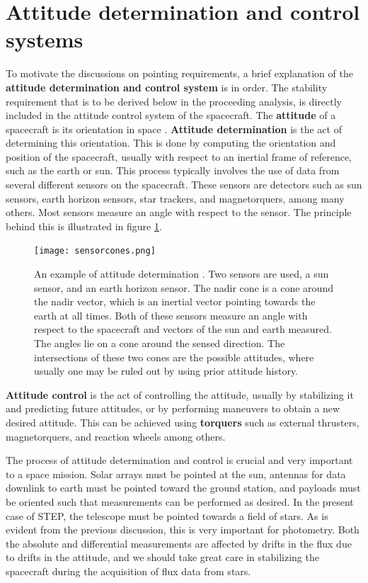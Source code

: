 \documentclass[../main.tex]{subfiles}
\begin{document}
\section{Attitude determination and control systems}
To motivate the discussions on pointing requirements, a brief explanation of the \textbf{attitude determination and control system} is in order. The stability requirement that is to be derived below in the proceeding analysis, is directly included in the attitude control system of the spacecraft. 
The \textbf{attitude} of a spacecraft is its orientation in space \cite{adcsbook}. 
\textbf{Attitude determination} is the act of determining this orientation. This is done by computing the orientation and position of the spacecraft, usually with respect to an inertial frame of reference, such as the earth or sun. This process typically involves the use of data from several different sensors on the spacecraft. These sensors are detectors such as sun sensors, earth horizon sensors, star trackers, and magnetorquers, among many others. Most sensors measure an angle with respect to the sensor. The principle behind this is illustrated in figure \ref{fig:sensorcones}. 

\begin{figure}[h!]
	\centering
	\texttt{[image: sensorcones.png]}
	\caption{An example of attitude determination \cite{adcsbook}. Two sensors are used, a sun sensor, and an earth horizon sensor. The nadir cone is a cone around the nadir vector, which is an inertial vector pointing towards the earth at all times. Both of these sensors measure an angle with respect to the spacecraft and vectors of the sun and earth measured. The angles lie on a cone around the sensed direction. The intersections of these two cones are the possible attitudes, where usually one may be ruled out by using prior attitude history.}
	\label{fig:sensorcones}
\end{figure}

\textbf{Attitude control} is the act of controlling the attitude, usually by stabilizing it and predicting future attitudes, or by performing maneuvers to obtain a new desired attitude. This can be achieved using \textbf{torquers} such as external thrusters, magnetorquers, and reaction wheels among others. 

The process of attitude determination and control is crucial and very important to a space mission. Solar arrays must be pointed at the sun, antennas for data downlink to earth must be pointed toward the ground station, and payloads must be oriented such that measurements can be performed as desired. In the present case of STEP, the telescope must be pointed towards a field of stars. As is evident from the previous discussion, this is very important for photometry. Both the absolute and differential measurements are affected by drifts in the flux due to drifts in the attitude, and we should take great care in stabilizing the spacecraft during the acquisition of flux data from stars.
\end{document}
